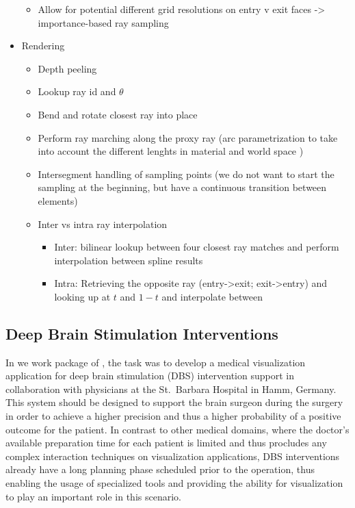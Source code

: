 \begin{itemize}
\begin{itemize}
    \item Allow for potential different grid resolutions on entry v exit faces -> importance-based ray sampling
\end{itemize}
\item Rendering
\begin{itemize}
    \item Depth peeling 
    \item Lookup ray id and $\theta$
    \item Bend and rotate closest ray into place
    \item Perform ray marching along the proxy ray (arc parametrization to take into account the different lenghts in material and world space \cite{guenter90arclength})
    \item Intersegment handling of sampling points (we do not want to start the sampling at the beginning, but have a continuous transition between elements)
    \item Inter vs intra ray interpolation
    \begin{itemize}
        \item Inter: bilinear lookup between four closest ray matches and perform interpolation between spline results
        \item Intra: Retrieving the opposite ray (entry->exit; exit->entry) and looking up at $t$ and $1-t$ and interpolate between
    \end{itemize}
\end{itemize}

\end{itemize}

\subsection{Deep Brain Stimulation Interventions}
\label{contributions:medbio:dbs}
In we work package of , the task was to develop a medical visualization application for deep brain stimulation (DBS) intervention support in collaboration with physicians at the St.~Barbara Hospital in Hamm, Germany. This system should be designed to support the brain surgeon during the surgery in order to achieve a higher precision and thus a higher probability of a positive outcome for the patient. In contrast to other medical domains, where the doctor's available preparation time for each patient is limited and thus procludes any complex interaction techniques on visualization applications, DBS interventions already have a long planning phase scheduled prior to the operation, thus enabling the usage of specialized tools and providing the ability for visualization to play an important role in this scenario.

